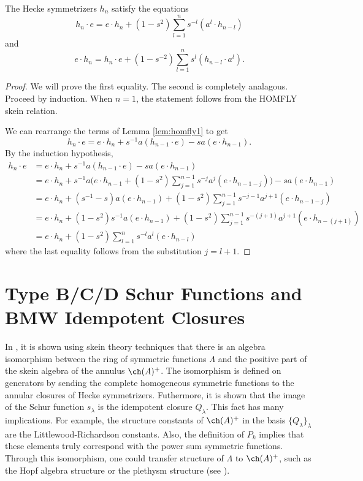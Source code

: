 \begin{theorem} \label{prop:homfly2}
The Hecke symmetrizers $h_n$ satisfy the equations
\[
h_n \cdot e = e \cdot h_n + ( 1 - s^2 ) \sum_{l=1}^{n} s^{-l} ( a^l \cdot h_{n-l} )
\]
and
\[
e \cdot h_n = h_n \cdot e + (1 - s^{-2} ) \sum_{l=1}^{n} s^l ( h_{n-l} \cdot a^l ).
\]
\end{theorem}
\begin{proof}
We will prove the first equality. The second is completely analagous. Proceed by induction. When $n=1$, the statement follows from the HOMFLY skein relation. 

We can rearrange the terms of Lemma \ref{lem:homfly1} to get
\begin{equation} \label{eq:homfly1b}
h_n \cdot e = e \cdot h_n + s^{-1} a ( h_{n-1} \cdot e ) - s a ( e \cdot h_{n-1} ).
\end{equation}
By the induction hypothesis,
\begin{align*}
h_n \cdot e & = e \cdot h_n + s^{-1} a ( h_{n-1} \cdot e ) - s a ( e \cdot h_{n-1} ) \\
& = e \cdot h_n + s^{-1} a \Big( e \cdot h_{n-1} + ( 1 - s^2 ) \sum_{j=1}^{n-1} s^{-j} a^j ( e \cdot h_{n-1-j} ) \Big) - s a ( e \cdot h_{n-1} ) \\
& = e \cdot h_n + ( s^{-1} - s ) a ( e \cdot h_{n-1} ) + ( 1 - s^2 ) \sum_{j=1}^{n-1} s^{-j-1} a^{j+1} ( e \cdot h_{n-1-j} ) \\ 
& = e \cdot h_n + ( 1 - s^2 ) s^{-1} a ( e \cdot h_{n-1} ) + ( 1 - s^2 ) \sum_{j=1}^{n-1} s^{-(j+1)} a^{j+1} ( e \cdot h_{n-(j+1)} ) \\
&= e \cdot h_n + ( 1 - s^2 ) \sum_{l=1}^{n} s^{-l} a^{l} ( e \cdot h_{n-l} )
\end{align*}
where the last equality follows from the substitution $j=l+1$. 
\end{proof}






\section{Type B/C/D Schur Functions and BMW Idempotent Closures} \label{sec:Lukac}
In , it is shown using skein theory techniques that there is an algebra isomorphism between the ring of symmetric functions $\Lambda$ and the positive part of the skein algebra of the annulus $\ch(A)^+$. The isomorphism is defined on generators by sending the complete homogeneous symmetric functions to the annular closures of Hecke symmetrizers. Futhermore, it is shown that the image of the Schur function $s_\lambda$ is the idempotent closure $Q_\lambda$. This fact has many implications. For example, the structure constants of $\ch(A)^+$ in the basis $\{ Q_\lambda \}_\lambda$ are the Littlewood-Richardson constants. Also, the definition of $P_k$ implies that these elements truly correspond with the power sum symmetric functions. Through this isomorphism, one could transfer structure of $\Lambda$ to $\ch(A)^+$, such as the Hopf algebra structure or the plethysm structure (see ). 

